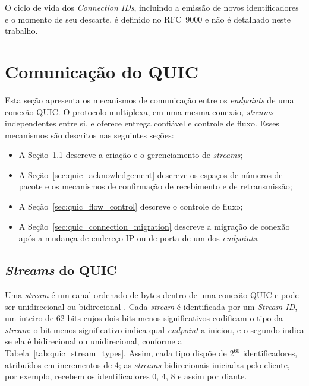 O ciclo de vida dos \textit{Connection IDs}, incluindo a emissão de novos identificadores e o momento de seu descarte, é definido no RFC~9000 \citep{rfc9000} e não é detalhado neste trabalho.

\section{Comunicação do QUIC}

Esta seção apresenta os mecanismos de comunicação entre os \textit{endpoints} de uma conexão QUIC. O protocolo multiplexa, em uma mesma conexão, \textit{streams} independentes entre si, e oferece entrega confiável e controle de fluxo. Esses mecanismos são descritos nas seguintes seções:

\begin{itemize}
    \item A Seção~\ref{sec:quic_streams} descreve a criação e o gerenciamento de \textit{streams};
    \item A Seção~\ref{sec:quic_acknowledgement} descreve os espaços de números de pacote e os mecanismos de confirmação de recebimento e de retransmissão;
    \item A Seção~\ref{sec:quic_flow_control} descreve o controle de fluxo;
    \item A Seção~\ref{sec:quic_connection_migration} descreve a migração de conexão após a mudança de endereço IP ou de porta de um dos \textit{endpoints}.
\end{itemize}

\subsection{\textit{Streams} do QUIC}
\label{sec:quic_streams}

Uma \textit{stream} é um canal ordenado de bytes dentro de uma conexão QUIC e pode ser unidirecional ou bidirecional \citep{rfc9000}. Cada \textit{stream} é identificada por um \textit{Stream ID}, um inteiro de 62 bits cujos dois bits menos significativos codificam o tipo da \textit{stream}: o bit menos significativo indica qual \textit{endpoint} a iniciou, e o segundo indica se ela é bidirecional ou unidirecional, conforme a Tabela~\ref{tab:quic_stream_types}. Assim, cada tipo dispõe de $2^{60}$ identificadores, atribuídos em incrementos de 4; as \textit{streams} bidirecionais iniciadas pelo cliente, por exemplo, recebem os identificadores 0, 4, 8 e assim por diante.

